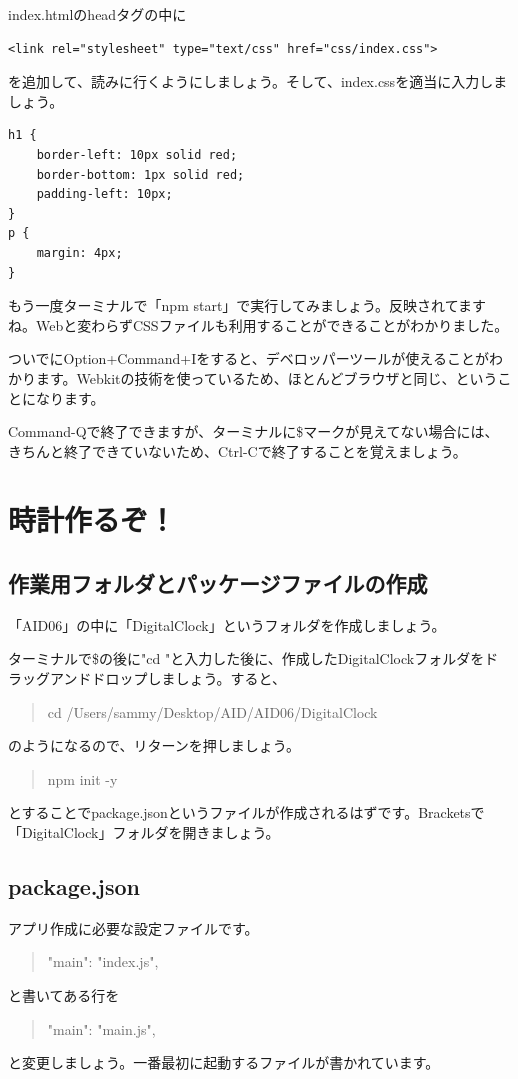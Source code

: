 \documentclass[mingoth,11pt,a4j,uplatex]{jsarticle}
\begin{document}
index.htmlのheadタグの中に
\begin{lstlisting}[caption=Hello World：index.html headタグ内]
    <link rel="stylesheet" type="text/css" href="css/index.css">
\end{lstlisting}
を追加して、読みに行くようにしましょう。そして、index.cssを適当に入力しましょう。
\begin{lstlisting}[caption=Hello World：css/index.css]
h1 {
    border-left: 10px solid red;
    border-bottom: 1px solid red;
    padding-left: 10px;
}
p {
    margin: 4px;
}
\end{lstlisting}
もう一度ターミナルで「npm start」で実行してみましょう。反映されてますね。Webと変わらずCSSファイルも利用することができることがわかりました。

ついでにOption+Command+Iをすると、デベロッパーツールが使えることがわかります。Webkitの技術を使っているため、ほとんどブラウザと同じ、ということになります。

Command-Qで終了できますが、ターミナルに\$マークが見えてない場合には、きちんと終了できていないため、Ctrl-Cで終了することを覚えましょう。

\section{時計作るぞ！}

\subsection{作業用フォルダとパッケージファイルの作成}
「AID06」の中に「DigitalClock」というフォルダを作成しましょう。

ターミナルで\$の後に"cd "と入力した後に、作成したDigitalClockフォルダをドラッグアンドドロップしましょう。すると、
\begin{quote}
cd /Users/sammy/Desktop/AID/AID06/DigitalClock 
\end{quote}
のようになるので、リターンを押しましょう。

\begin{quote}
npm init -y
\end{quote}
とすることでpackage.jsonというファイルが作成されるはずです。Bracketsで「DigitalClock」フォルダを開きましょう。

\subsection{package.json}
アプリ作成に必要な設定ファイルです。
\begin{quote}
  "main": "index.js",
\end{quote}
と書いてある行を
\begin{quote}
  "main": "main.js",
\end{quote}
と変更しましょう。一番最初に起動するファイルが書かれています。
\end{document}
